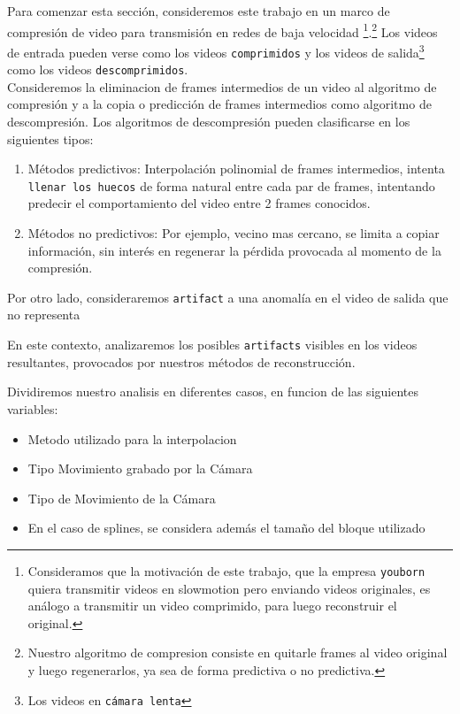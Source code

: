 Para comenzar esta sección, consideremos este trabajo en un marco de compresión de video para transmisión en redes de baja velocidad \footnote{Consideramos que la motivación de este trabajo, que la empresa \texttt{youborn} quiera transmitir videos en slowmotion pero enviando videos originales, es análogo a transmitir un video comprimido, para luego reconstruir el original.}.\footnote{Nuestro algoritmo de compresion consiste en quitarle frames al video original y luego regenerarlos, ya sea de forma predictiva o no predictiva.} Los videos de entrada pueden verse como los videos \texttt{comprimidos} y los videos de salida\footnote{Los videos en \texttt{cámara lenta}} como los videos \texttt{descomprimidos}.\\

Consideremos la eliminacion de frames intermedios de un video al algoritmo de compresión y a la copia o predicción de frames intermedios como algoritmo de descompresión. Los algoritmos de descompresión pueden clasificarse en los siguientes tipos:
\begin{enumerate}
	\item Métodos predictivos: Interpolación polinomial de frames intermedios, intenta \texttt{llenar los huecos} de forma natural entre cada par de frames, intentando predecir el comportamiento del video entre 2 frames conocidos.
	\item Métodos no predictivos: Por ejemplo, vecino mas cercano, se limita a copiar información, sin interés en regenerar la pérdida provocada al momento de la compresión.
\end{enumerate}

Por otro lado, consideraremos \texttt{artifact} a una anomalía en el video de salida que no representa

En este contexto, analizaremos los posibles \texttt{artifacts} visibles en los videos resultantes, provocados por nuestros métodos de reconstrucción. 

Dividiremos nuestro analisis en diferentes casos, en funcion de las siguientes variables:
\begin{itemize}
	\item Metodo utilizado para la interpolacion
	\item Tipo Movimiento grabado por la Cámara
	\item Tipo de Movimiento de la Cámara
	\item En el caso de splines, se considera además el tamaño del bloque utilizado
\end{itemize}

